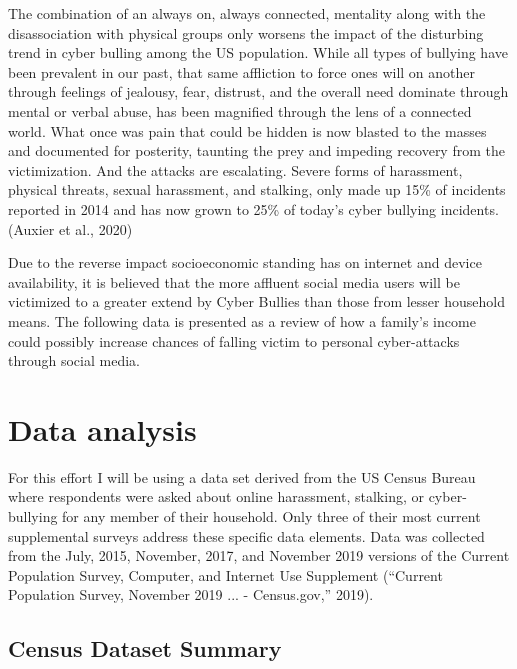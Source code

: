 \documentclass[
  man,LLO-8200, Introduction to Data Science]{apa6}
\begin{document}
The combination of an always on, always connected, mentality along with the disassociation with physical groups only worsens the impact of the disturbing trend in cyber bulling among the US population. While all types of bullying have been prevalent in our past, that same affliction to force ones will on another through feelings of jealousy, fear, distrust, and the overall need dominate through mental or verbal abuse, has been magnified through the lens of a connected world. What once was pain that could be hidden is now blasted to the masses and documented for posterity, taunting the prey and impeding recovery from the victimization. And the attacks are escalating. Severe forms of harassment, physical threats, sexual harassment, and stalking, only made up 15\% of incidents reported in 2014 and has now grown to 25\% of today's cyber bullying incidents. (Auxier et al., 2020)

Due to the reverse impact socioeconomic standing has on internet and device availability, it is believed that the more affluent social media users will be victimized to a greater extend by Cyber Bullies than those from lesser household means. The following data is presented as a review of how a family's income could possibly increase chances of falling victim to personal cyber-attacks through social media.

\hypertarget{data-analysis}{%
\section{Data analysis}\label{data-analysis}}

For this effort I will be using a data set derived from the US Census Bureau where respondents were asked about online harassment, stalking, or cyber-bullying for any member of their household. Only three of their most current supplemental surveys address these specific data elements. Data was collected from the July, 2015, November, 2017, and November 2019 versions of the Current Population Survey, Computer, and Internet Use Supplement ({``Current Population Survey, November 2019 ... - Census.gov,''} 2019).

\hypertarget{census-dataset-summary}{%
\subsection{Census Dataset Summary}\label{census-dataset-summary}}
\end{document}
